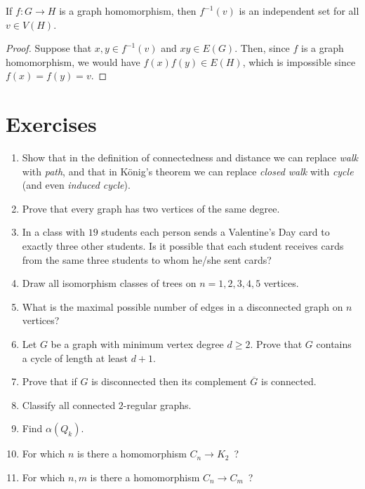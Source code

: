 \begin{lemma} If $f:G\longrightarrow H$ is a graph homomorphism, then $f^{-1}(v)$ is an independent set for all $v\in V(H)$.
\end{lemma}

\begin{proof}
Suppose that $x,y\in f^{-1}(v)$ and $xy\in E(G)$. Then, since $f$ is a graph homomorphism, we would have $f(x)f(y)\in E(H)$, which is impossible since $f(x)=f(y)=v$.
\end{proof}




\section{Exercises}

\begin{enumerate}
\item Show that in the definition of connectedness and distance we can replace \emph{walk} with \emph{path}, and that in K\"onig's theorem we can replace \emph{closed walk} with \emph{cycle} (and even \emph{induced cycle}).

\item Prove that every graph has two vertices of the same degree.
\item In a class with $19$ students each person sends a Valentine's Day card to exactly three other students. Is it possible that each student receives cards from the same three students to whom he/she sent cards?
\item Draw all isomorphism classes of trees on $n=1,2,3,4,5$ vertices.
\item What is the maximal possible number of edges in a disconnected graph on $n$ vertices?
\item Let $G$ be a graph with minimum vertex degree $d\geq 2$. Prove that $G$ contains a cycle of length at least $d+1$.
\item Prove that if $G$ is disconnected then its complement $\overline{G}$ is connected.
\item Classify all connected $2$-regular graphs.
\item Find $\alpha(Q_k)$.
\item For which $n$ is there a homomorphism $C_n\to K_2$\ ?
\item For which $n,m$ is there a homomorphism $C_n\to C_m$\ ?
\end{enumerate}